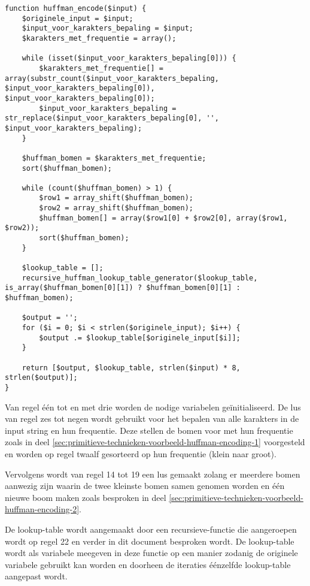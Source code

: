 \begin{lstlisting}
function huffman_encode($input) {
	$originele_input = $input;
	$input_voor_karakters_bepaling = $input;
	$karakters_met_frequentie = array();
	
	while (isset($input_voor_karakters_bepaling[0])) {
		$karakters_met_frequentie[] = array(substr_count($input_voor_karakters_bepaling, $input_voor_karakters_bepaling[0]), $input_voor_karakters_bepaling[0]);
		$input_voor_karakters_bepaling = str_replace($input_voor_karakters_bepaling[0], '', $input_voor_karakters_bepaling);
	}
	
	$huffman_bomen = $karakters_met_frequentie;
	sort($huffman_bomen);
	
	while (count($huffman_bomen) > 1) {
		$row1 = array_shift($huffman_bomen);
		$row2 = array_shift($huffman_bomen);
		$huffman_bomen[] = array($row1[0] + $row2[0], array($row1, $row2));
		sort($huffman_bomen);
	}
	
	$lookup_table = [];
	recursive_huffman_lookup_table_generator($lookup_table, is_array($huffman_bomen[0][1]) ? $huffman_bomen[0][1] : $huffman_bomen);
	
	$output = '';
	for ($i = 0; $i < strlen($originele_input); $i++) {
		$output .= $lookup_table[$originele_input[$i]];
	}
	
	return [$output, $lookup_table, strlen($input) * 8, strlen($output)];
}
\end{lstlisting}

Van regel één tot en met drie worden de nodige variabelen geïnitialiseerd. De lus van regel zes tot negen wordt gebruikt voor het bepalen van alle karakters in de input \gls{string} en hun frequentie. Deze stellen de bomen voor met hun frequentie zoals in deel \ref{sec:primitieve-technieken-voorbeeld-huffman-encoding-1} voorgesteld en worden op regel twaalf gesorteerd op hun frequentie (klein naar groot).

Vervolgens wordt van regel 14 tot 19 een lus gemaakt zolang er meerdere bomen aanwezig zijn waarin de twee kleinste bomen samen genomen worden en één nieuwe boom maken zoals besproken in deel \ref{sec:primitieve-technieken-voorbeeld-huffman-encoding-2}.

De \gls{lookup-table} wordt aangemaakt door een \gls{recursieve-functie} die aangeroepen wordt op regel 22 en verder in dit document besproken wordt. De \gls{lookup-table} wordt als variabele meegeven in deze functie op een manier zodanig de originele variabele gebruikt kan worden en doorheen de iteraties éénzelfde \gls{lookup-table} aangepast wordt.

